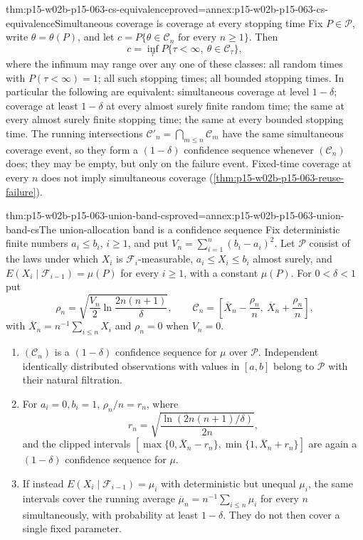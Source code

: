 \begin{hbtheorem}{thm:p15-w02b-p15-063-cs-equivalence}{proved=annex:p15-w02b-p15-063-cs-equivalence}{Simultaneous coverage is coverage at every stopping time}
Fix \(P\in\mathcal P\), write \(\theta=\theta(P)\), and let
\(c=P\{\theta\in\mathcal C_n\text{ for every }n\geq1\}\). Then
\[
 c=\inf_\tau P\{\tau<\infty,\ \theta\in\mathcal C_\tau\},
\]
where the infimum may range over any one of these classes: all random
times with \(P(\tau<\infty)=1\); all such stopping times; all bounded
stopping times. In particular the following are equivalent:
simultaneous coverage at level \(1-\delta\); coverage at least \(1-\delta\)
at every almost surely finite random time; the same at every almost surely
finite stopping time; the same at every bounded stopping time.
The running intersections \(\mathcal C'_n=\bigcap_{m\leq n}\mathcal C_m\)
have the same simultaneous coverage event, so they form a
\((1-\delta)\) confidence sequence whenever \((\mathcal C_n)\) does; they
may be empty, but only on the failure event.
Fixed-time coverage at every \(n\) does not imply simultaneous coverage
(\cref{thm:p15-w02b-p15-063-reuse-failure}).
\end{hbtheorem}

\begin{hbtheorem}{thm:p15-w02b-p15-063-union-band-cs}{proved=annex:p15-w02b-p15-063-union-band-cs}{The union-allocation band is a confidence sequence}
Fix deterministic finite numbers \(a_i\leq b_i\), \(i\geq1\), and put
\(V_n=\sum_{i=1}^n(b_i-a_i)^2\). Let \(\mathcal P\) consist of the laws
under which \(X_i\) is \(\mathcal F_i\)-measurable,
\(a_i\leq X_i\leq b_i\) almost surely, and
\(E(X_i\mid\mathcal F_{i-1})=\mu(P)\) for every \(i\geq1\), with a
constant \(\mu(P)\). For \(0<\delta<1\) put
\[
 \rho_n=\sqrt{\frac{V_n}{2}\ln\frac{2n(n+1)}\delta},\qquad
 \mathcal C_n=\left[\overline X_n-\frac{\rho_n}n,\
                     \overline X_n+\frac{\rho_n}n\right],
\]
with \(\overline X_n=n^{-1}\sum_{i\leq n}X_i\) and \(\rho_n=0\) when
\(V_n=0\).
\begin{enumerate}
\item \((\mathcal C_n)\) is a \((1-\delta)\) confidence sequence for
 \(\mu\) over \(\mathcal P\). Independent identically distributed
 observations with values in \([a,b]\) belong to \(\mathcal P\) with
 their natural filtration.
\item For \(a_i=0,b_i=1\), \(\rho_n/n=r_n\), where
 \[
       r_n=\sqrt{\frac{\ln(2n(n+1)/\delta)}{2n}},
 \]
 and the clipped intervals
 \([\max\{0,\overline X_n-r_n\},\min\{1,\overline X_n+r_n\}]\) are again a
 \((1-\delta)\) confidence sequence for \(\mu\).
\item If instead \(E(X_i\mid\mathcal F_{i-1})=\mu_i\) with deterministic
 but unequal \(\mu_i\), the same intervals cover the running average
 \(\overline\mu_n=n^{-1}\sum_{i\leq n}\mu_i\) for every \(n\)
 simultaneously, with probability at least \(1-\delta\). They do not then
 cover a single fixed parameter.
\end{enumerate}
\end{hbtheorem}

